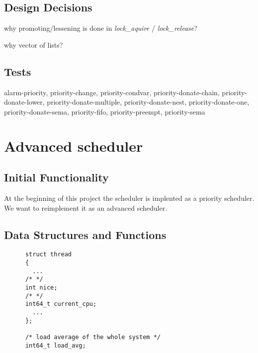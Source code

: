 

    \subsection{Design Decisions}

	why promoting/lessening is done in \textit{lock\_aquire} / \textit{lock\_release}?
	
	why vector of lists?

    \subsection{Tests}

	alarm-priority, priority-change, priority-condvar, priority-donate-chain, priority-donate-lower, priority-donate-multiple, priority-donate-nest, priority-donate-one, priority-donate-sema, priority-fifo, priority-preempt, priority-sema

\section{Advanced scheduler}

    \subsection{Initial Functionality}

	At the beginning of this project the scheduler is implented as a priority scheduler. We want to reimplement it as an advanced scheduler.

    \subsection{Data Structures and Functions}

    \begin{lstlisting}
      struct thread
      {
	    ...
	  /* */
	  int nice;
	  /* */
	  int64_t current_cpu;  
	    ...
      };      

      /* load average of the whole system */
      int64_t load_avg;

    \end{lstlisting}


